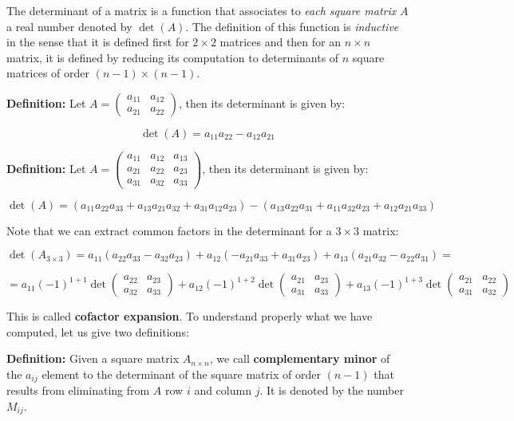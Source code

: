 \documentclass[11pt]{article}
\begin{document}
The determinant of a matrix is a function that associates to \emph{each
square matrix} \(A\) a real number denoted by \(\det(A)\). The
definition of this function is \emph{inductive} in the sense that it is
defined first for \(2\times 2\) matrices and then for an \(n\times n\)
matrix, it is defined by reducing its computation to determinants of
\(n\) square matrices of order \((n-1)\times (n-1)\).

\textbf{Definition:} Let
\(A = \begin{pmatrix} a_{11} & a_{12} \\ a_{21} & a_{22} \end{pmatrix}\),
then its determinant is given by:

\[
\det(A) = a_{11}a_{22} - a_{12}a_{21}
\]

\textbf{Definition:} Let
\(A = \begin{pmatrix} a_{11} & a_{12} & a_{13} \\ a_{21} & a_{22} & a_{23} \\ a_{31} & a_{32} & a_{33} \end{pmatrix}\),
then its determinant is given by:

\[
\det(A) = (a_{11}a_{22}a_{33} + a_{13}a_{21}a_{32} + a_{31}a_{12}a_{23}) - (a_{13}a_{22}a_{31} + a_{11}a_{32}a_{23} + a_{12}a_{21}a_{33})
\]

Note that we can extract common factors in the determinant for a
\(3\times 3\) matrix:

\[
\det\left(A_{3\times 3}\right) = a_{11}(a_{22}a_{33} - a_{32}a_{23}) + a_{12}( - a_{21}a_{33} + a_{31}a_{23}) + a_{13}(a_{21}a_{32} - a_{22}a_{31}) =
\]

\[
= a_{11}(-1)^{1+1}\det\begin{pmatrix}a_{22} & a_{23} \\ a_{32} & a_{33} \end{pmatrix} + a_{12}(-1)^{1+2} \det\begin{pmatrix}a_{21} & a_{23} \\ a_{31} & a_{33} \end{pmatrix} + a_{13}(-1)^{1+3}\det\begin{pmatrix}a_{21} & a_{22} \\ a_{31} & a_{32}\end{pmatrix}
\]

This is called \textbf{cofactor expansion}. To understand properly what
we have computed, let us give two definitions:

\textbf{Definition:} Given a square matrix \(A_{n\times n}\), we call
\textbf{complementary minor} of the \(a_{ij}\) element to the
determinant of the square matrix of order \((n-1)\) that results from
eliminating from \(A\) row \(i\) and column \(j\). It is denoted by the
number \(M_{ij}\).
\end{document}
